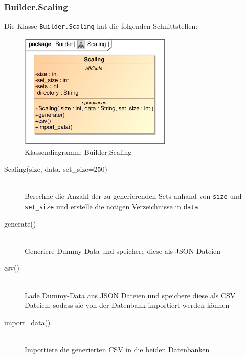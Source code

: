 \subsubsection{Builder.Scaling}
Die Klasse \verb|Builder.Scaling| hat die folgenden Schnittstellen:
\begin{figure}[H]
    \myfloatalign
    \includegraphics[width=0.65\textwidth]{gfx/MtGDeepAnalysis/Scaling.eps}
    \caption{Klassendiagramm: Builder.Scaling}
    \label{fig:class:builder.Scaling}
\end{figure}
\begin{description}
    \item[Scaling(size, data, set\_size=250)] \hfill \\
    Berechne die Anzahl der zu generierenden Sets anhand von \verb|size| und \verb|set_size| und erstelle die nötigen Verzeichnisse in \verb|data|.
    
    \item[generate()] \hfill \\
    Generiere Dummy-Data und speichere diese als \ac{JSON} Dateien
    
    \item[csv()] \hfill \\
    Lade Dummy-Data aus \ac{JSON} Dateien und speichere diese als \ac{CSV} Dateien, sodass sie von der Datenbank importiert werden können
    
    \item[import\_data()] \hfill \\
    Importiere die generierten \ac{CSV} in die beiden Datenbanken
\end{description}



